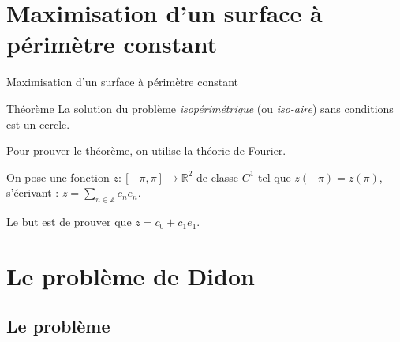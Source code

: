 \documentclass[11pt,envcountsect,aspectratio=169]{beamer} %
\newcommand{\R}{\mathbb{R}}
\newcommand{\Z}{\mathbb{Z}}
\begin{document}
\section{Maximisation d'un surface à périmètre constant}



\begin{frame}{Maximisation d'un surface à périmètre constant}

\begin{beamerboxesrounded}[upper=titreB,lower=texteB,shadow=true]{Théorème}
		La solution du problème \emph{isopérimétrique} (ou \emph{iso-aire}) sans conditions est un cercle.
\end{beamerboxesrounded}

Pour prouver le théorème, on utilise la théorie de Fourier.

On pose une fonction $z: [-\pi,\pi] \rightarrow \R^2$ de classe $C^1$ tel que $z(-\pi)=z(\pi)$, s'écrivant : $z = \sum_{n \in \Z}{c_n e_n}$.

Le but est de prouver que $z = c_0 + c_1 e_1$.

\end{frame}








\section{Le problème de Didon}


\subsection{Le problème}
\end{document}
